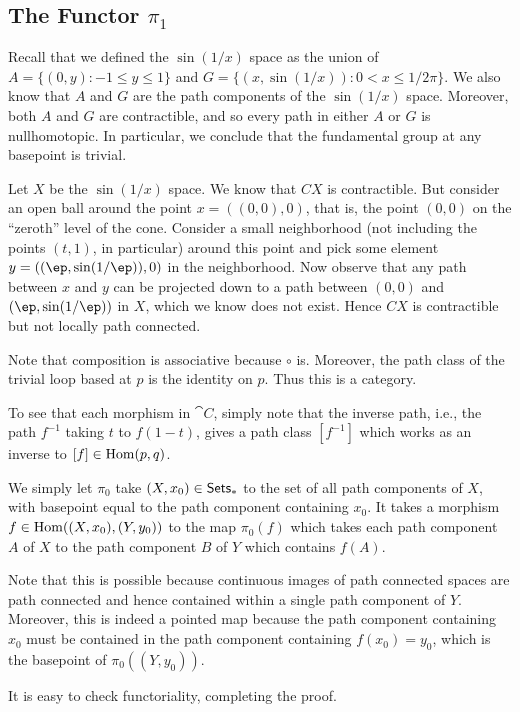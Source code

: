 \documentclass[../../solutions.tex]{subfiles}
\begin{document}
\subsection{\texorpdfstring{The Functor $\pi_1$}{}}
\begin{exercise} \leavevmode
Recall that we defined the $\sin(1/x)$ space as the union of $A=\{(0,y):-1\le y\le1\}$ and $G=\{(x,\sin(1/x)):0<x\le1/2\pi\}$. We also know that $A$ and $G$ are the path components of the $\sin(1/x)$ space. Moreover, both $A$ and $G$ are contractible, and so every path in either $A$ or $G$ is nullhomotopic. In particular, we conclude that the fundamental group at any basepoint is trivial.  
\end{exercise} 

\begin{exercise} \leavevmode 
Let $X$ be the $\sin(1/x)$ space. We know that $CX$ is contractible. But consider an open ball around the point $x=((0,0),0)$, that is, the point $(0,0)$ on the ``zeroth'' level of the cone. Consider a small neighborhood (not including the points $(t,1)$, in particular) around this point and pick some element $y=((\ep,\sin(1/\ep)),0)$ in the neighborhood. Now observe that any path between $x$ and $y$ can be projected down to a path between $(0,0)$ and $(\ep,\sin(1/\ep))$ in $X$, which we know does not exist. Hence $CX$ is contractible but not locally path connected. 
\end{exercise}

\begin{exercise} \leavevmode
Note that composition is associative because $\circ$ is. Moreover, the path class of the trivial loop based at $p$ is the identity on $p$. Thus this is a category. 

To see that each morphism in $\cat C$, simply note that the inverse path, i.e., the path $f^{-1}$ taking $t$ to $f(1-t)$, gives a path class $[f^{-1}]$ which works as an inverse to $[f]\in\operatorname{Hom}(p,q)$. 
\end{exercise}

\begin{exercise} \leavevmode 
We simply let $\pi_0$ take $(X,x_0)\in\mathsf{Sets}_*$ to the set of all path components of $X$, with basepoint equal to the path component containing $x_0$. It takes a morphism $f\in\operatorname{Hom}((X,x_0),(Y,y_0))$ to the map $\pi_0(f)$ which takes each path component $A$ of $X$ to the path component $B$ of $Y$ which contains $f(A)$. 

Note that this is possible because continuous images of path connected spaces are path connected and hence contained within a single path component of $Y$. Moreover, this is indeed a pointed map because the path component containing $x_0$ must be contained in the path component containing $f(x_0)=y_0$, which is the basepoint of $\pi_0((Y,y_0))$. 

It is easy to check functoriality, completing the proof. 
\end{exercise}
\end{document}
